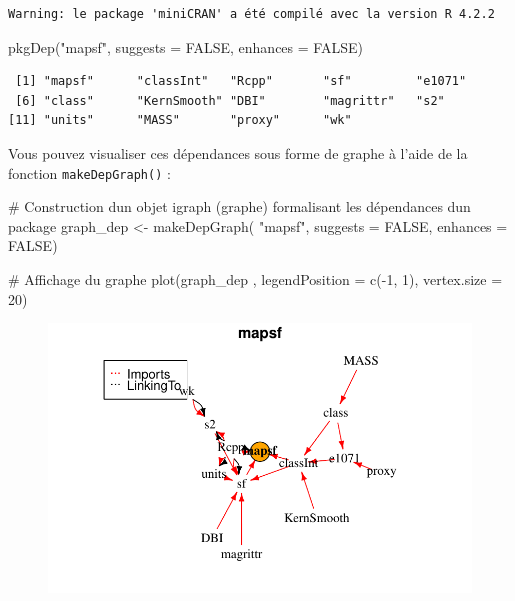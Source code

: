 \documentclass[
  letterpaper,
  DIV=11,
  numbers=noendperiod]{scrartcl}
\newenvironment{Shaded}{\begin{snugshade}}{\end{snugshade}}
\newcommand{\AttributeTok}[1]{\textcolor[rgb]{0.40,0.45,0.13}{#1}}
\newcommand{\CommentTok}[1]{\textcolor[rgb]{0.37,0.37,0.37}{#1}}
\newcommand{\ConstantTok}[1]{\textcolor[rgb]{0.56,0.35,0.01}{#1}}
\newcommand{\DecValTok}[1]{\textcolor[rgb]{0.68,0.00,0.00}{#1}}
\newcommand{\FunctionTok}[1]{\textcolor[rgb]{0.28,0.35,0.67}{#1}}
\newcommand{\NormalTok}[1]{\textcolor[rgb]{0.00,0.23,0.31}{#1}}
\newcommand{\OtherTok}[1]{\textcolor[rgb]{0.00,0.23,0.31}{#1}}
\newcommand{\SpecialCharTok}[1]{\textcolor[rgb]{0.37,0.37,0.37}{#1}}
\newcommand{\StringTok}[1]{\textcolor[rgb]{0.13,0.47,0.30}{#1}}
\begin{document}
\begin{verbatim}
Warning: le package 'miniCRAN' a été compilé avec la version R 4.2.2
\end{verbatim}

\begin{Shaded}
\begin{Highlighting}[]
\FunctionTok{pkgDep}\NormalTok{(}\StringTok{"mapsf"}\NormalTok{, }\AttributeTok{suggests =} \ConstantTok{FALSE}\NormalTok{, }\AttributeTok{enhances =} \ConstantTok{FALSE}\NormalTok{)}
\end{Highlighting}
\end{Shaded}

\begin{verbatim}
 [1] "mapsf"      "classInt"   "Rcpp"       "sf"         "e1071"     
 [6] "class"      "KernSmooth" "DBI"        "magrittr"   "s2"        
[11] "units"      "MASS"       "proxy"      "wk"        
\end{verbatim}

Vous pouvez visualiser ces dépendances sous forme de graphe à l'aide de
la fonction \texttt{makeDepGraph()} :

\begin{Shaded}
\begin{Highlighting}[]
\CommentTok{\# Construction d\textquotesingle{}un objet igraph (graphe) formalisant les dépendances d\textquotesingle{}un package}
\NormalTok{graph\_dep }\OtherTok{\textless{}{-}} \FunctionTok{makeDepGraph}\NormalTok{( }\StringTok{"mapsf"}\NormalTok{, }\AttributeTok{suggests =} \ConstantTok{FALSE}\NormalTok{, }\AttributeTok{enhances =} \ConstantTok{FALSE}\NormalTok{)}

\CommentTok{\# Affichage du graphe}
\FunctionTok{plot}\NormalTok{(graph\_dep , }\AttributeTok{legendPosition =} \FunctionTok{c}\NormalTok{(}\SpecialCharTok{{-}}\DecValTok{1}\NormalTok{, }\DecValTok{1}\NormalTok{), }\AttributeTok{vertex.size =} \DecValTok{20}\NormalTok{)}
\end{Highlighting}
\end{Shaded}

\begin{figure}[H]

{\centering \includegraphics{minicran_files/figure-pdf/unnamed-chunk-3-1.pdf}

}

\end{figure}
\end{document}
